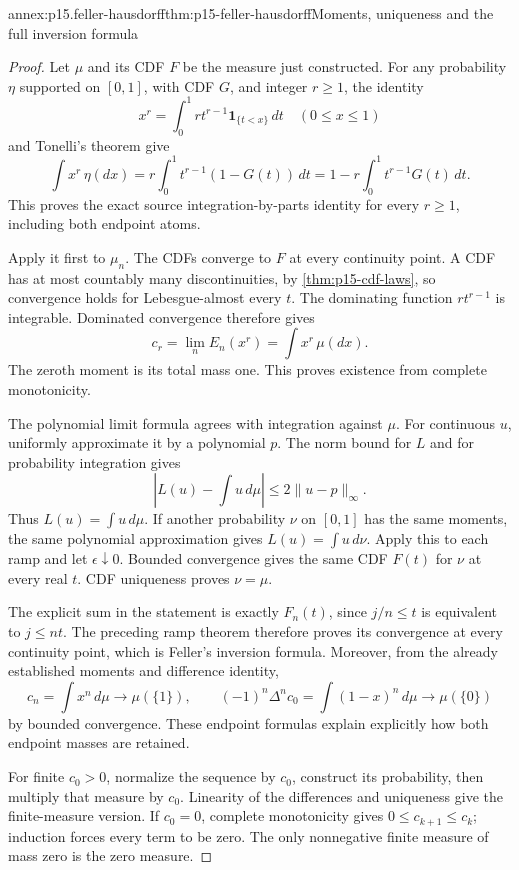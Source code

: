 \begin{annexitem}{annex:p15.feller-hausdorff}{thm:p15-feller-hausdorff}{Moments, uniqueness and the full inversion formula}
\begin{proof}
Let \(\mu\) and its CDF \(F\) be the measure just constructed.
For any probability \(\eta\) supported on \([0,1]\), with CDF \(G\),
and integer \(r\geq1\), the identity
\[
                  x^r=\int_0^1r t^{r-1}\mathbf1_{\{t<x\}}\,dt
                                      \quad(0\leq x\leq1)
\]
and Tonelli's theorem give
\[
               \int x^r\,\eta(dx)
                  =r\int_0^1 t^{r-1}(1-G(t))\,dt
                  =1-r\int_0^1t^{r-1}G(t)\,dt.
\]
This proves the exact source integration-by-parts identity for every
\(r\geq1\), including both endpoint atoms.

Apply it first to \(\mu_n\).
The CDFs converge to \(F\) at every continuity point.
A CDF has at most countably many discontinuities, by
\cref{thm:p15-cdf-laws}, so convergence holds for Lebesgue-almost
every \(t\). The dominating function \(r t^{r-1}\) is integrable.
Dominated convergence therefore gives
\[
                     c_r=\lim_n E_n(x^r)
                                  =\int x^r\,\mu(dx).
\]
The zeroth moment is its total mass one.
This proves existence from complete monotonicity.

The polynomial limit formula agrees with integration against \(\mu\).
For continuous \(u\), uniformly approximate it by a polynomial \(p\).
The norm bound for \(L\) and for probability integration gives
\[
                  |L(u)-\int u\,d\mu|\leq2\|u-p\|_\infty.
\]
Thus \(L(u)=\int u\,d\mu\).
If another probability \(\nu\) on \([0,1]\) has the same moments,
the same polynomial approximation gives \(L(u)=\int u\,d\nu\).
Apply this to each ramp and let \(\epsilon\downarrow0\).
Bounded convergence gives the same CDF \(F(t)\) for \(\nu\)
at every real \(t\). CDF uniqueness proves \(\nu=\mu\).

The explicit sum in the statement is exactly \(F_n(t)\), since
\(j/n\leq t\) is equivalent to \(j\leq nt\).
The preceding ramp theorem therefore proves its convergence at
every continuity point, which is Feller's inversion formula.
Moreover, from the already established moments and difference identity,
\[
            c_n=\int x^n\,d\mu\longrightarrow\mu(\{1\}),\qquad
            (-1)^n\Delta^nc_0=\int(1-x)^n\,d\mu
                                      \longrightarrow\mu(\{0\})
\]
by bounded convergence. These endpoint formulas explain explicitly
how both endpoint masses are retained.

For finite \(c_0>0\), normalize the sequence by \(c_0\), construct
its probability, then multiply that measure by \(c_0\).
Linearity of the differences and uniqueness give the finite-measure
version. If \(c_0=0\), complete monotonicity gives
\(0\leq c_{k+1}\leq c_k\); induction forces every term to be zero.
The only nonnegative finite measure of mass zero is the zero measure.
\end{proof}
\end{annexitem}

